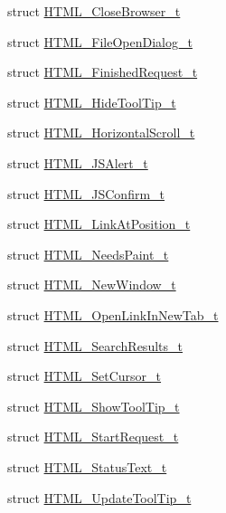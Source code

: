 \begin{DoxyCompactItemize}
struct \hyperlink{structValve_1_1Steamworks_1_1HTML__CloseBrowser__t}{H\+T\+M\+L\+\_\+\+Close\+Browser\+\_\+t}
\item 
struct \hyperlink{structValve_1_1Steamworks_1_1HTML__FileOpenDialog__t}{H\+T\+M\+L\+\_\+\+File\+Open\+Dialog\+\_\+t}
\item 
struct \hyperlink{structValve_1_1Steamworks_1_1HTML__FinishedRequest__t}{H\+T\+M\+L\+\_\+\+Finished\+Request\+\_\+t}
\item 
struct \hyperlink{structValve_1_1Steamworks_1_1HTML__HideToolTip__t}{H\+T\+M\+L\+\_\+\+Hide\+Tool\+Tip\+\_\+t}
\item 
struct \hyperlink{structValve_1_1Steamworks_1_1HTML__HorizontalScroll__t}{H\+T\+M\+L\+\_\+\+Horizontal\+Scroll\+\_\+t}
\item 
struct \hyperlink{structValve_1_1Steamworks_1_1HTML__JSAlert__t}{H\+T\+M\+L\+\_\+\+J\+S\+Alert\+\_\+t}
\item 
struct \hyperlink{structValve_1_1Steamworks_1_1HTML__JSConfirm__t}{H\+T\+M\+L\+\_\+\+J\+S\+Confirm\+\_\+t}
\item 
struct \hyperlink{structValve_1_1Steamworks_1_1HTML__LinkAtPosition__t}{H\+T\+M\+L\+\_\+\+Link\+At\+Position\+\_\+t}
\item 
struct \hyperlink{structValve_1_1Steamworks_1_1HTML__NeedsPaint__t}{H\+T\+M\+L\+\_\+\+Needs\+Paint\+\_\+t}
\item 
struct \hyperlink{structValve_1_1Steamworks_1_1HTML__NewWindow__t}{H\+T\+M\+L\+\_\+\+New\+Window\+\_\+t}
\item 
struct \hyperlink{structValve_1_1Steamworks_1_1HTML__OpenLinkInNewTab__t}{H\+T\+M\+L\+\_\+\+Open\+Link\+In\+New\+Tab\+\_\+t}
\item 
struct \hyperlink{structValve_1_1Steamworks_1_1HTML__SearchResults__t}{H\+T\+M\+L\+\_\+\+Search\+Results\+\_\+t}
\item 
struct \hyperlink{structValve_1_1Steamworks_1_1HTML__SetCursor__t}{H\+T\+M\+L\+\_\+\+Set\+Cursor\+\_\+t}
\item 
struct \hyperlink{structValve_1_1Steamworks_1_1HTML__ShowToolTip__t}{H\+T\+M\+L\+\_\+\+Show\+Tool\+Tip\+\_\+t}
\item 
struct \hyperlink{structValve_1_1Steamworks_1_1HTML__StartRequest__t}{H\+T\+M\+L\+\_\+\+Start\+Request\+\_\+t}
\item 
struct \hyperlink{structValve_1_1Steamworks_1_1HTML__StatusText__t}{H\+T\+M\+L\+\_\+\+Status\+Text\+\_\+t}
\item 
struct \hyperlink{structValve_1_1Steamworks_1_1HTML__UpdateToolTip__t}{H\+T\+M\+L\+\_\+\+Update\+Tool\+Tip\+\_\+t}

\end{DoxyCompactItemize}
